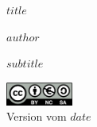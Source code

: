 \setlength\parindent{0pt}      %
\begin{titlepage}
  \begin{center}

  \vspace*{10mm}
  \begin{minipage}[]{0.85\textwidth}
    \begin{center}
      {\color{HSNRblue1}
      \Huge \textbf{$title$}
      }
    \end{center}
  \end{minipage}

  \vspace{6mm}

  \normalsize $author$

   \vspace{8mm}



   \vspace{8mm}

  \begin{minipage}[]{0.85\textwidth}
    \begin{center}
      {\color{HSNRblue1}
      \huge $subtitle$
      }
    \end{center}
  \end{minipage}
  
  \vfill
  \includegraphics[width=22mm]{images/ccbyncsa.png}\\
  \footnotesize Version vom $date$
  \end{center}

\thispagestyle{empty}
\end{titlepage}

